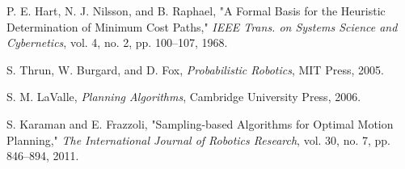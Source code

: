 \documentclass[letterpaper, 10 pt, conference]{ieeeconf}
\begin{document}
\begin{thebibliography}{1}

 P. E. Hart, N. J. Nilsson, and B. Raphael, "A Formal Basis for the Heuristic Determination of Minimum Cost Paths," \textit{IEEE Trans. on Systems Science and Cybernetics}, vol. 4, no. 2, pp. 100--107, 1968.

 S. Thrun, W. Burgard, and D. Fox, \textit{Probabilistic Robotics}, MIT Press, 2005.

 S. M. LaValle, \textit{Planning Algorithms}, Cambridge University Press, 2006.

 S. Karaman and E. Frazzoli, "Sampling-based Algorithms for Optimal Motion Planning," \textit{The International Journal of Robotics Research}, vol. 30, no. 7, pp. 846--894, 2011.

\end{thebibliography}
\end{document}
